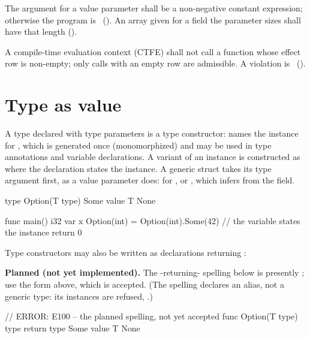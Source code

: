 \begin{constraint}
  The argument for a value parameter shall be a non-negative constant expression;
  otherwise the program is \illformed{}~(). An array given for a field the
  parameter sizes shall have that length ().
\end{constraint}

\begin{constraint}
  A compile-time evaluation context (CTFE) shall not call a function whose
  effect row is non-empty; only calls with an empty row are admissible. A
  violation is \illformed{}~().
\end{constraint}

\section{Type as value}
\label{sec:gen.type-value}

\pnum
A type declared with type parameters is a type constructor:  names the
instance for , which is generated once (monomorphized) and may be used in type
annotations and variable declarations. A variant of an instance is constructed as
 where the declaration states the instance.  A generic struct
takes its type argument first, as a value parameter does:  for
, or , which infers  from the field.

\begin{laincode}
type Option(T type) {
    Some { value T }
    None
}

func main() i32 {
    var x Option(int) = Option(int).Some(42)   // the variable states the instance
    return 0
}
\end{laincode}

\pnum
Type constructors may also be written as  declarations returning
:

\begin{note}
  \textbf{Planned (not yet implemented).}  The -returning-
  spelling below is presently ; use the
   form above, which is accepted. (The spelling
   declares an alias, not a generic type: its
  instances are refused, .)
\end{note}

\begin{laincode}
// ERROR: E100 -- the planned spelling, not yet accepted
func Option(T type) type {
    return type {
        Some { value T }
        None
    }
}
\end{laincode}

